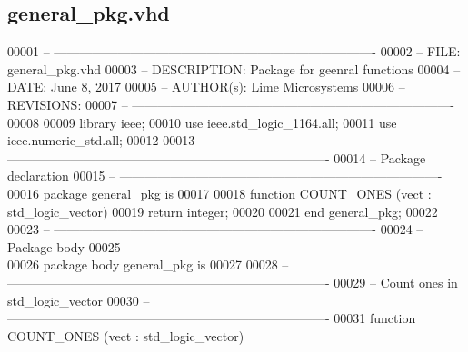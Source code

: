 \subsection{general\+\_\+pkg.\+vhd}
\label{general__pkg_8vhd_source}

\begin{DoxyCode}
00001 \textcolor{keyword}{-- ---------------------------------------------------------------------------- }
00002 \textcolor{keyword}{-- FILE:    general\_pkg.vhd}
00003 \textcolor{keyword}{-- DESCRIPTION: Package for geenral functions}
00004 \textcolor{keyword}{-- DATE:    June 8, 2017}
00005 \textcolor{keyword}{-- AUTHOR(s):   Lime Microsystems}
00006 \textcolor{keyword}{-- REVISIONS:}
00007 \textcolor{keyword}{-- ----------------------------------------------------------------------------}
00008 
00009 \textcolor{vhdlkeyword}{library }\textcolor{keywordflow}{ieee};
00010 \textcolor{vhdlkeyword}{use }ieee.std\_logic\_1164.\textcolor{keywordflow}{all};
00011 \textcolor{vhdlkeyword}{use }ieee.numeric\_std.\textcolor{keywordflow}{all};
00012 
00013 \textcolor{keyword}{-- ----------------------------------------------------------------------------}
00014 \textcolor{keyword}{-- Package declaration}
00015 \textcolor{keyword}{-- ----------------------------------------------------------------------------}
00016 \textcolor{keywordflow}{package }general_pkg \textcolor{keywordflow}{is}
00017 
00018 \textcolor{keywordflow}{function} COUNT_ONES (vect : \textcolor{comment}{std\_logic\_vector})
00019       \textcolor{keywordflow}{return} \textcolor{comment}{integer};
00020       
00021 \textcolor{keywordflow}{end}  \textcolor{vhdlchar}{general\_pkg};
00022 
00023 \textcolor{keyword}{-- ----------------------------------------------------------------------------}
00024 \textcolor{keyword}{-- Package body}
00025 \textcolor{keyword}{-- ----------------------------------------------------------------------------}
00026 \textcolor{keywordflow}{package} \textcolor{keywordflow}{body} general_pkg \textcolor{keywordflow}{is}
00027 
00028 \textcolor{keyword}{-- ----------------------------------------------------------------------------}
00029 \textcolor{keyword}{-- Count ones in std\_logic\_vector}
00030 \textcolor{keyword}{-- ----------------------------------------------------------------------------}
00031    \textcolor{keywordflow}{function} COUNT_ONES (vect : \textcolor{comment}{std\_logic\_vector})  

\end{DoxyCode}
